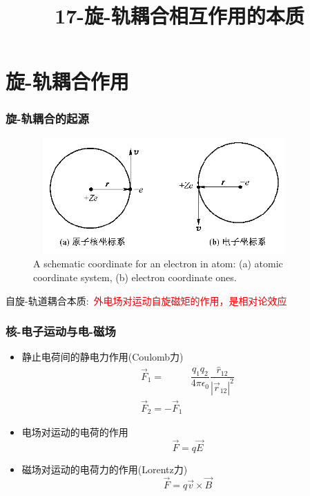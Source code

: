 {%
\title{17-旋-轨耦合相互作用的本质}
\section{旋-轨耦合作用}
\frame
{
\frametitle{旋-轨耦合的起源}
\begin{figure}[h!]
\centering
\includegraphics[height=1.75in,width=3.95in,viewport=0 0 600 270,clip]{Figures/SOC_cor.png}
\caption{\tiny \textrm{A schematic coordinate for an electron in atom: (a) atomic coordinate system, (b) electron coordinate ones.}}%
\label{Nuclear_Electron}
\end{figure}
自旋-轨道耦合本质:~\textcolor{red}{外电场对运动自旋磁矩的作用，是相对论效应}
}

\frame
{
\frametitle{核-电子运动与电-磁场}
\begin{itemize}
	\item 静止电荷间的静电力作用(\textrm{Coulomb}力)
		\begin{displaymath}
			\begin{aligned}
				\vec F_1=&\dfrac{q_1q_2}{4\pi\epsilon_0}\dfrac{\hat r_{12}}{|\vec r_{12}|^2}\\
				\vec F_2=-\vec F_1
			\end{aligned}
		\end{displaymath}
	\item 电场对运动的电荷的作用
		\begin{displaymath}
			\vec F=q\vec E
		\end{displaymath}
	\item 磁场对运动的电荷力的作用(\textrm{Lorentz}力)
		\begin{displaymath}
		\vec F=q\vec v\times\vec B
		\end{displaymath}
\end{itemize}
}

}
